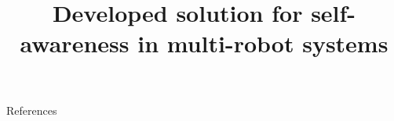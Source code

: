 \documentclass{beamer}
\title{Developed solution for self-awareness in multi-robot systems}
\date{}
\renewcommand{\[}{\begingroup\small\OriginalDisplayMathOpen}
\renewcommand{\]}{\OriginalDisplayMathClose\endgroup}
\begin{document}
    \frame{\titlepage}
    

    

    


    

    


    

    

    


    


    \begin{frame}[allowframebreaks]{References}
        \tiny
        
        
    \end{frame}
\end{document}
